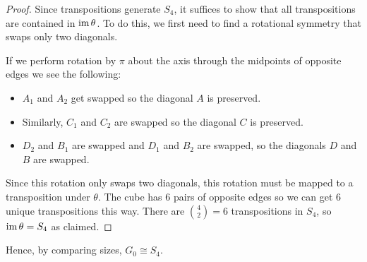 \documentclass[../main.tex]{subfiles}
\begin{document}
\begin{proof}
  Since transpositions generate $S_4$, it suffices to show that all transpositions are contained in $\operatorname{im} \theta$.
  To do this, we first need to find a rotational symmetry that swaps only two diagonals.
  \begin{center}
  \end{center}

  If we perform rotation by $\pi$ about the axis through the midpoints of opposite edges we see the following:
  \begin{itemize}
    \item $A_1$ and $A_2$ get swapped so the diagonal $A$ is preserved.
    \item Similarly, $C_1$ and $C_2$ are swapped so the diagonal $C$ is preserved.
    \item $D_2$ and $B_1$ are swapped and $D_1$ and $B_2$ are swapped, so the diagonals $D$ and $B$ are swapped.
  \end{itemize}
  Since this rotation only swaps two diagonals, this rotation must be mapped to a transposition under $\theta$.
  The cube has 6 pairs of opposite edges so we can get 6 unique transpositions this way.
  There are $\binom{4}{2} = 6$ transpositions in $S_4$, so $\operatorname{im} \theta = S_4$ as claimed.
\end{proof}
Hence, by comparing sizes, $G_0 \cong S_4$.
\end{document}
